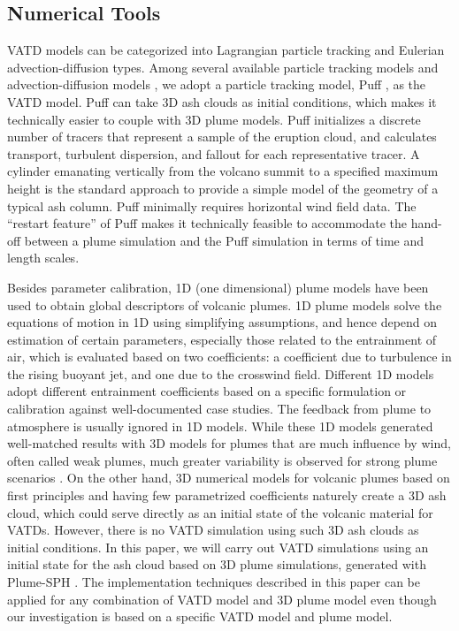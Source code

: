 \documentclass[draft,linenumbers]{agujournal2019}
\begin{document}
\subsection{Numerical Tools}
VATD models can be categorized into Lagrangian particle tracking and Eulerian advection-diffusion types.  Among several available particle tracking models \citep[e.g.][]{walko1995hypact, searcy1998puff, d1998modeling, draxler1998overview} and advection-diffusion models \citep[e.g.][]{bonadonna2005total, folch2009fall3d, schwaiger2012ash3d}, we adopt a particle tracking model, Puff \citep{tanaka1991development,searcy1998puff}, as the VATD model. Puff can take 3D ash clouds as initial conditions, which makes it technically easier to couple with 3D plume models. Puff initializes a discrete number of tracers that represent a sample of the eruption cloud, and calculates transport, turbulent dispersion, and fallout for each representative tracer.  A cylinder emanating vertically from the volcano summit to a specified maximum height is the standard approach to provide a simple model of the geometry of a typical ash column. Puff minimally requires horizontal wind field data. The ``restart feature'' of Puff makes it technically feasible to accommodate the hand-off between a plume simulation and the Puff simulation in terms of time and length scales.

Besides parameter calibration, 1D (one dimensional) plume models have been used to obtain global descriptors of volcanic plumes.  1D plume models \citep [e.g.][]{woods1988fluid, bursik2001effect, mastin2007user, de2015plume, folch2016fplume, pouget2016sensitivity} solve the equations of motion in 1D using simplifying assumptions, and hence depend on estimation of certain parameters, especially those related to the entrainment of air, which is evaluated based on two coefficients: a coefficient due to turbulence in the rising buoyant jet, and one due to the crosswind field. Different 1D models adopt different entrainment coefficients based on a specific formulation or calibration against well-documented case studies. The feedback from plume to atmosphere is usually ignored in 1D models. While these 1D models generated well-matched results with 3D models for plumes that are much influence by wind, often called weak plumes, much greater variability is observed for strong plume scenarios \citep{costa2016results}. On the other hand, 3D numerical models for volcanic plumes based on first principles and having few parametrized coefficients \citep{oberhuber1998volcanic, neri2003multiparticle, suzuki2005numerical, cerminara2016ashee, cao2018plume} naturely create a 3D ash cloud, which could serve directly as an initial state of the volcanic material for VATDs. However, there is no VATD simulation using such 3D ash clouds as initial conditions. In this paper, we will carry out VATD simulations using an initial state for the ash cloud based on 3D plume simulations, generated with Plume-SPH \citep{cao2018plume}.  The implementation techniques described in this paper can be applied for any combination of VATD model and 3D plume model even though our investigation is based on a specific VATD model and plume model.
\end{document}
